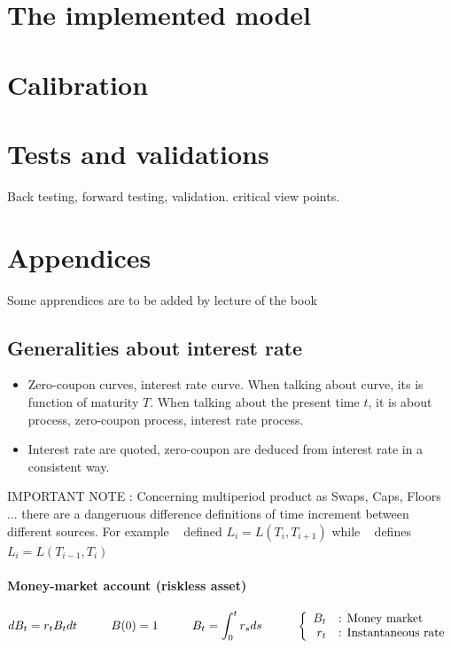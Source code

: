 \documentclass[a4paper,10pt]{article}
\newcommand{\Bt}{B_t}
\newcommand{\intt}{\int_0^t}
\begin{document}
\section{The implemented model}
\section{Calibration}
\section{Tests and validations}
Back testing, forward testing, validation. critical view points.

\newpage
\section{Appendices}
\appendix
Some apprendices are to be added by lecture of the book ~\cite{BRIGO2006}
\subsection{Generalities about interest rate}
\begin{itemize}
 \item Zero-coupon curves, interest rate curve. When talking about curve, its is function of maturity $T$. When talking about the present time $t$, it is about process, zero-coupon process, interest rate process.
 \item Interest rate are quoted, zero-coupon are deduced from interest rate in a consistent way.
\end{itemize}
{\color{red}IMPORTANT NOTE : Concerning multiperiod product as Swaps, Caps, Floors ... there are a dangeruous difference definitions of time increment between different sources. For example ~\cite{THAI2013} defined $L_i=L(T_i,T_{i+1})$ while ~\cite{BRIGO2006} defines $L_i=L(T_{i-1},T_i)$}
\paragraph{Money-market account (riskless asset)}
\[
d\Bt=r_t \Bt dt \hspace{1cm} B(0)=1 \hspace{1cm} B_t = \intt r_s ds
\hspace{1cm}
\left\{
\begin{array}{r l}
\Bt &\text{: Money market} \\
r_t &\text{: Instantaneous rate} 
\end{array}
\right.
\]
\end{document}
